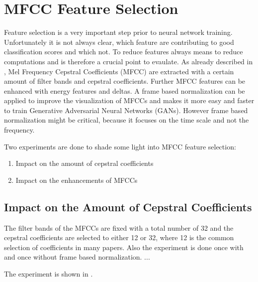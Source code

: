 
\section{MFCC Feature Selection}\label{sec:exp_fs}
\thesisStateNotReady
Feature selection is a very important step prior to neural network training.
Unfortunately it is not always clear, which feature are contributing to good classification scores and which not.
To reduce features always means to reduce computations and is therefore a crucial point to evaulate.
As already described in , Mel Frequency Cepstral Coefficients (MFCC) are extracted with a certain amount of filter bands and cepstral coefficients.
Further MFCC features can be enhanced with energy features and deltas.
A frame based normalization can be applied to improve the visualization of MFCCs and makes it more easy and faster to train Generative Adversarial Neural Networks (GANs).
However frame based normalization might be critical, because it focuses on the time scale and not the frequency. 

Two experiments are done to shade some light into MFCC feature selection:
\begin{enumerate}
    \item Impact on the amount of cepstral coefficients
    \item Impact on the enhancements of MFCCs
\end{enumerate}


\subsection{Impact on the Amount of Cepstral Coefficients}
The filter bands of the MFCCs are fixed with a total number of 32 and the cepstral coefficients are selected to either 12 or 32, where 12 is the common selection of coefficients in many papers.
Also the experiment is done once with and once without frame based normalization.
...

The experiment is shown in .



